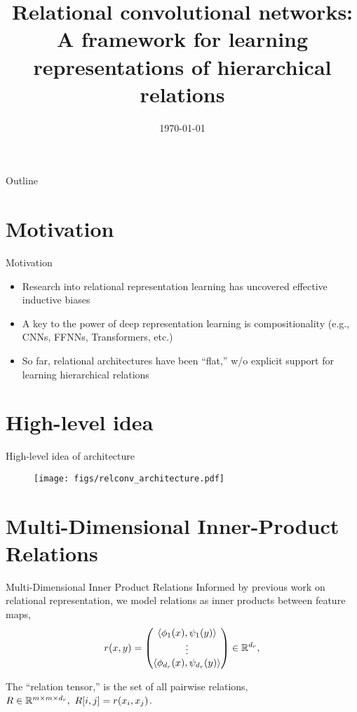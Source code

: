 \documentclass{beamer}
\title{Relational convolutional networks: \\\small{A framework for learning representations of hierarchical relations}}
\date{\today}
\begin{document}
\frame{\titlepage}

\begin{frame}{Outline}
    \tableofcontents
\end{frame}

\section{Motivation}
\begin{frame}{Motivation}
\begin{itemize}
    \item Research into relational representation learning has uncovered effective inductive biases
    \item A key to the power of deep representation learning is compositionality (e.g., CNNs, FFNNs, Transformers, etc.)
    \item So far, relational architectures have been ``flat,'' w/o explicit support for learning hierarchical relations
  \end{itemize}
\end{frame}

\section{High-level idea}

\begin{frame}{High-level idea of architecture}
  \begin{figure}
    \centering
    \texttt{[image: figs/relconv\_architecture.pdf]}
  \end{figure}
\end{frame}

\section{Multi-Dimensional Inner-Product Relations}
\begin{frame}{Multi-Dimensional  Inner Product Relations}
  Informed by previous work on relational representation, we model relations as inner products between feature maps,
  \begin{equation*}%
    r(x, y) = \begin{pmatrix}
        \iprod{\phi_1(x)}{\psi_1(y)} \\ \vdots \\ \iprod{\phi_{d_r}(x)}{\psi_{d_r}(y)}
      \end{pmatrix} \in \reals^{d_r},
\end{equation*}

The ``relation tensor,'' is the set of all pairwise relations, $R \in \mathbb{R}^{m \times m \times d_r},\ R[i,j] = r(x_i, x_j)$.
\end{frame}
\end{document}
